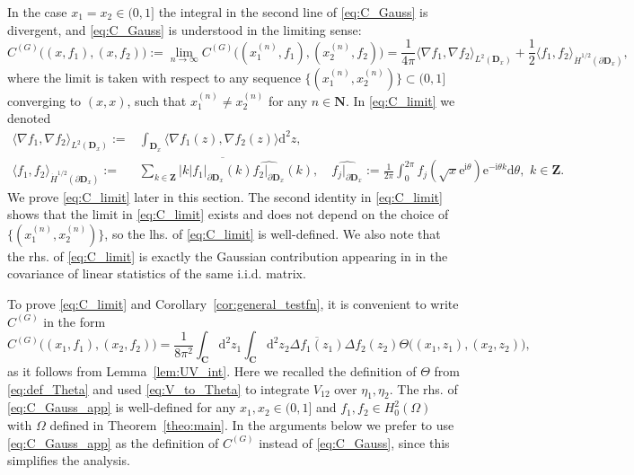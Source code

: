 \documentclass[10pt]{amsart}
\numberwithin{equation}{section}
\newcommand{\dif}{\mathrm{d}}
\newcommand{\C}{\mathbf{C}}
\newcommand{\DD}{\mathbf{D}}
\newcommand{\N}{\mathbf{N}}
\newcommand{\ii}{\mathrm{i}}
\newcommand{\ee}{\mathrm{e}}
\begin{document}
In the case $x_1=x_2\in(0,1]$ the integral in the second line of \eqref{eq:C_Gauss} is divergent, and \eqref{eq:C_Gauss} is understood in the limiting sense:
\begin{equation}
C^{(G)}\big((x,f_1),(x,f_2)\big):=\!\!\lim_{n\to\infty}C^{(G)}\big((x_1^{(n)}\!\!,f_1),(x_2^{(n)}\!\!,f_2)\big) = \frac{1}{4\pi}\langle \nabla f_1,\nabla f_2\rangle_{L^2(\DD_x)} + \frac{1}{2}\langle f_1,f_2\rangle_{{\dot{H}}^{1/2}(\partial\DD_x)},
\label{eq:C_limit}
\end{equation}
where the limit is taken with respect to any sequence $\{(x_1^{(n)},x_2^{(n)})\}\subset (0,1]$ converging to $(x,x)$, such that $x_1^{(n)}\neq x_2^{(n)}$ for any $n\in\N$. In \eqref{eq:C_limit} we denoted
\begin{equation}
\begin{split}
\langle \nabla f_1,\nabla f_2\rangle_{L^2(\DD_x)}:=&\int_{\DD_x} \langle \nabla f_1(z),\nabla f_2(z)\rangle \dif^2 z,\\
\langle f_1,f_2\rangle_{{\dot{H}}^{1/2}(\partial\DD_x)}:=&\sum_{k\in\mathbf{Z}} |k|\overline{\widehat{f_1\big|_{\partial\DD_x}}(k)}\widehat{f_2\big|_{\partial\DD_x}}(k),\quad \widehat{f_j\big|_{\partial\DD_x}}:=\frac{1}{2\pi} \int_0^{2\pi} f_j(\sqrt{x}\ee^{\ii\theta})\ee^{-\ii\theta k}\dif\theta,\,\, k\in\mathbf{Z}.
\end{split}
\end{equation}
We prove \eqref{eq:C_limit} later in this section. The second identity in \eqref{eq:C_limit} shows that the limit in \eqref{eq:C_limit} exists and does not depend on the choice of $\{(x_1^{(n)},x_2^{(n)})\}$, so the lhs. of \eqref{eq:C_limit} is well-defined. We also note that the rhs. of \eqref{eq:C_limit} is exactly the Gaussian contribution appearing in \cite[Eq.(2.6)]{macroCLT_complex} in the covariance of linear statistics of the same i.i.d. matrix.

To prove \eqref{eq:C_limit} and Corollary~\ref{cor:general_testfn}, it is convenient to write $C^{(G)}$ in the form
\begin{equation}
C^{(G)}\big((x_1,f_1),(x_2,f_2)\big) = \frac{1}{8\pi^2} \int_\C\dif^2 z_1\int_\C \dif^2 z_2 \overline{\Delta f_1(z_1)}\Delta f_2(z_2) \Theta \big((x_1,z_1),(x_2,z_2)\big),
\label{eq:C_Gauss_app}
\end{equation}
as it follows from Lemma~\ref{lem:UV_int}. Here we recalled the definition of $\Theta$ from \eqref{eq:def_Theta} and used \eqref{eq:V_to_Theta} to integrate $V_{12}$ over $\eta_1,\eta_2$. The rhs. of \eqref{eq:C_Gauss_app} is well-defined for any $x_1,x_2\in (0,1]$ and $f_1,f_2\in H^2_0(\Omega)$ with $\Omega$ defined in Theorem~\ref{theo:main}. In the arguments below we prefer to use \eqref{eq:C_Gauss_app} as the definition of $C^{(G)}$ instead of \eqref{eq:C_Gauss}, since this simplifies the analysis.
\end{document}
